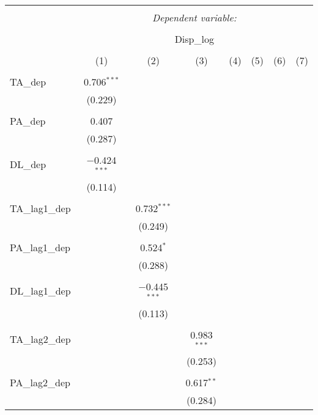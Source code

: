 
\begin{table}[!htbp] \centering 
  \caption{} 
  \label{} 
\begin{tabular}{@{\extracolsep{5pt}}lccccccc} 
\\[-1.8ex]\hline 
\hline \\[-1.8ex] 
 & \multicolumn{7}{c}{\textit{Dependent variable:}} \\ 
\cline{2-8} 
\\[-1.8ex] & \multicolumn{7}{c}{Disp\_log} \\ 
\\[-1.8ex] & (1) & (2) & (3) & (4) & (5) & (6) & (7)\\ 
\hline \\[-1.8ex] 
 TA\_dep & 0.706$^{***}$ &  &  &  &  &  &  \\ 
  & (0.229) &  &  &  &  &  &  \\ 
  & & & & & & & \\ 
 PA\_dep & 0.407 &  &  &  &  &  &  \\ 
  & (0.287) &  &  &  &  &  &  \\ 
  & & & & & & & \\ 
 DL\_dep & $-$0.424$^{***}$ &  &  &  &  &  &  \\ 
  & (0.114) &  &  &  &  &  &  \\ 
  & & & & & & & \\ 
 TA\_lag1\_dep &  & 0.732$^{***}$ &  &  &  &  &  \\ 
  &  & (0.249) &  &  &  &  &  \\ 
  & & & & & & & \\ 
 PA\_lag1\_dep &  & 0.524$^{*}$ &  &  &  &  &  \\ 
  &  & (0.288) &  &  &  &  &  \\ 
  & & & & & & & \\ 
 DL\_lag1\_dep &  & $-$0.445$^{***}$ &  &  &  &  &  \\ 
  &  & (0.113) &  &  &  &  &  \\ 
  & & & & & & & \\ 
 TA\_lag2\_dep &  &  & 0.983$^{***}$ &  &  &  &  \\ 
  &  &  & (0.253) &  &  &  &  \\ 
  & & & & & & & \\ 
 PA\_lag2\_dep &  &  & 0.617$^{**}$ &  &  &  &  \\ 
  &  &  & (0.284) &  &  &  &  \\ 

\end{tabular}
\end{table}
